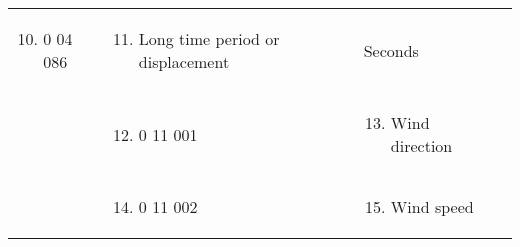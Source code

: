 \begin{longtable}[]{@{}llll@{}}
\begin{minipage}[t]{0.22\columnwidth}
\begin{enumerate}
\setcounter{enumi}{9}
\item
  0 04 086
\end{enumerate}\strut
\end{minipage} & \begin{minipage}[t]{0.22\columnwidth}\raggedright
\begin{enumerate}
\setcounter{enumi}{10}
\item
  Long time period or displacement
\end{enumerate}\strut
\end{minipage} & \begin{minipage}[t]{0.22\columnwidth}\raggedright
Seconds\strut
\end{minipage}\tabularnewline
\begin{minipage}[t]{0.22\columnwidth}\raggedright
\strut
\end{minipage} & \begin{minipage}[t]{0.22\columnwidth}\raggedright
\begin{enumerate}
\setcounter{enumi}{11}
\item
  0 11 001
\end{enumerate}\strut
\end{minipage} & \begin{minipage}[t]{0.22\columnwidth}\raggedright
\begin{enumerate}
\setcounter{enumi}{12}
\item
  Wind direction
\end{enumerate}\strut
\end{minipage} & \begin{minipage}[t]{0.22\columnwidth}\raggedright
\strut
\end{minipage}\tabularnewline
\begin{minipage}[t]{0.22\columnwidth}\raggedright
\strut
\end{minipage} & \begin{minipage}[t]{0.22\columnwidth}\raggedright
\begin{enumerate}
\setcounter{enumi}{13}
\item
  0 11 002
\end{enumerate}\strut
\end{minipage} & \begin{minipage}[t]{0.22\columnwidth}\raggedright
\begin{enumerate}
\setcounter{enumi}{14}
\item
  Wind speed
\end{enumerate}\strut

\end{minipage}
\end{longtable}
